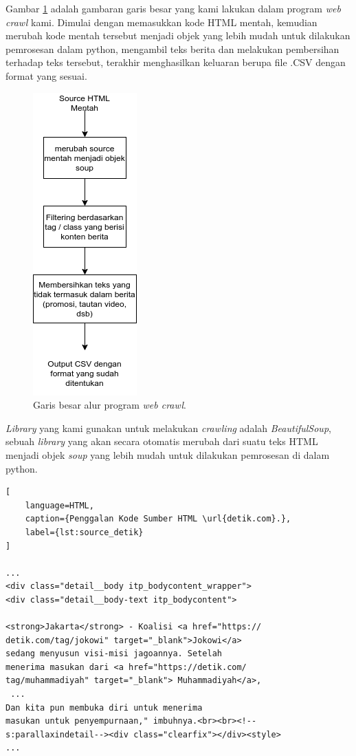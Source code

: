 Gambar \ref{fig:webcrawl_method} adalah gambaran garis besar yang kami lakukan dalam program \textit{web crawl} kami. Dimulai dengan memasukkan kode HTML mentah, kemudian merubah kode mentah tersebut menjadi objek yang lebih mudah untuk dilakukan pemrosesan dalam python, mengambil teks berita dan melakukan pembersihan terhadap teks tersebut, terakhir menghasilkan keluaran berupa file .CSV dengan format yang sesuai.

\begin{figure} [ht]
    \centering
    \includegraphics[width=0.35\linewidth]{gambar/webcrawl_long.png}
    \caption{Garis besar alur program \textit{web crawl}.}
    \label{fig:webcrawl_method}
\end{figure}

\textit{Library} yang kami gunakan untuk melakukan \textit{crawling} adalah \textit{BeautifulSoup}, sebuah \textit{library} yang akan secara otomatis merubah dari suatu teks HTML menjadi objek \textit{soup} yang lebih mudah untuk dilakukan pemrosesan di dalam python.

\begin{lstlisting}[
    language=HTML, 
    caption={Penggalan Kode Sumber HTML \url{detik.com}.},
    label={lst:source_detik}
]

...
<div class="detail__body itp_bodycontent_wrapper">
<div class="detail__body-text itp_bodycontent">

<strong>Jakarta</strong> - Koalisi <a href="https://
detik.com/tag/jokowi" target="_blank">Jokowi</a> 
sedang menyusun visi-misi jagoannya. Setelah 
menerima masukan dari <a href="https://detik.com/
tag/muhammadiyah" target="_blank"> Muhammadiyah</a>,
 ... 
Dan kita pun membuka diri untuk menerima 
masukan untuk penyempurnaan," imbuhnya.<br><br><!--
s:parallaxindetail--><div class="clearfix"></div><style>
...

\end{lstlisting}


